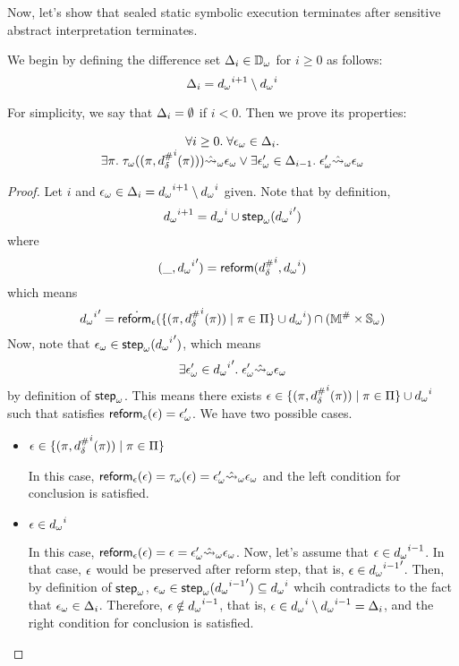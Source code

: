 Now, let's show that sealed static symbolic execution terminates after
sensitive abstract interpretation terminates.

We begin by defining the difference set $\Delta_i \in {\mathbb{D}}_\omega$ for $i \geq 0$ as follows:
\[
  \Delta_i = {{d}_\omega}^{i+1} \setminus {{d}_\omega}^i
\]

For simplicity, we say that $\Delta_i = \emptyset$ if $i < 0$.
Then we prove its properties:
\begin{lemma}\label{lemma:diffset_prop}
  \[
    \begin{array}{c}
      \forall i \geq 0. \; \forall {\epsilon}_\omega \in \Delta_i. \\
      \exists \pi. \; {\tau}_\omega((\pi,{{d}^{\#}_\delta}^i(\pi))) \hat{\leadsto}_\omega {\epsilon}_\omega 
      \lor \exists {\epsilon}_\omega' \in \Delta_{i-1} . \; {\epsilon}_\omega' \hat{\leadsto}_\omega {\epsilon}_\omega
    \end{array}
  \]
\end{lemma}
\begin{proof}
  Let $i$ and ${\epsilon}_\omega \in \Delta_i = {{d}_\omega}^{i+1} \setminus {{d}_\omega}^i$ given.
  Note that by definition,
  \[
    {{d}_\omega}^{i+1} = {{d}_\omega}^i \cup {\textsf{step}}_\omega({{{d}_\omega}^i}')
  \]
  where
  \[
    (\_, {{{d}_\omega}^i}') = \textsf{reform}({{d}^{\#}_\delta}^i, {{d}_\omega}^i)
  \]
  which means
  \[
    {{{d}_\omega}^i}' =
    \dot{\textsf{reform}_\epsilon}(\{ (\pi, {{d}^{\#}_\delta}^i(\pi)) \mid \pi \in \Pi \} \cup {{d}_\omega}^i)
    \cap ({\mathbb{M}}^{\#} \times {\mathbb{S}}_\omega)
  \]
  Now, note that ${\epsilon}_\omega \in {\textsf{step}}_\omega({{{d}_\omega}^i}')$, which means
  \[
    \exists {\epsilon}_\omega' \in {{{d}_\omega}^i}'. \; {\epsilon}_\omega' \hat{\leadsto}_\omega {\epsilon}_\omega
  \] by definition of ${\textsf{step}}_\omega$.
  This means there exists $\epsilon \in \{ (\pi, {{d}^{\#}_\delta}^i(\pi)) \mid \pi \in \Pi \} \cup {{d}_\omega}^i$
  such that satisfies $\textsf{reform}_\epsilon(\epsilon) = {\epsilon}_\omega'$. We have two possible cases.
  \begin{itemize}
 
  \item $\epsilon \in \{ (\pi, {{d}^{\#}_\delta}^i(\pi)) \mid \pi \in \Pi \}$

  In this case, $\textsf{reform}_\epsilon(\epsilon) = {\tau}_\omega(\epsilon) = {\epsilon}_\omega'
  \hat{\leadsto}_\omega {\epsilon}_\omega$
  and the left condition for conclusion is satisfied.
  
  \item $\epsilon \in {{d}_\omega}^i$

  In this case, $\textsf{reform}_\epsilon(\epsilon) = \epsilon = {\epsilon}_\omega' \hat{\leadsto}_\omega {\epsilon}_\omega$.
  Now, let's assume that $\epsilon \in {{d}_\omega}^{i-1}$.
  In that case, $\epsilon$ would be preserved after reform step, that is,
  $\epsilon \in {{{d}_\omega}^{i-1}}'$. Then, by definition of ${\textsf{step}}_\omega$,
  ${\epsilon}_\omega \in {\textsf{step}}_\omega({{{d}_\omega}^{i-1}}') \subseteq {{d}_\omega}^i$
  whcih contradicts to the fact that ${\epsilon}_\omega \in \Delta_i$.
  Therefore, $\epsilon \notin {{d}_\omega}^{i-1}$, that is,
  $\epsilon \in {{d}_\omega}^i \setminus {{d}_\omega}^{i-1} = \Delta_i$,
  and the right condition for conclusion is satisfied.
  \end{itemize}
\end{proof}

